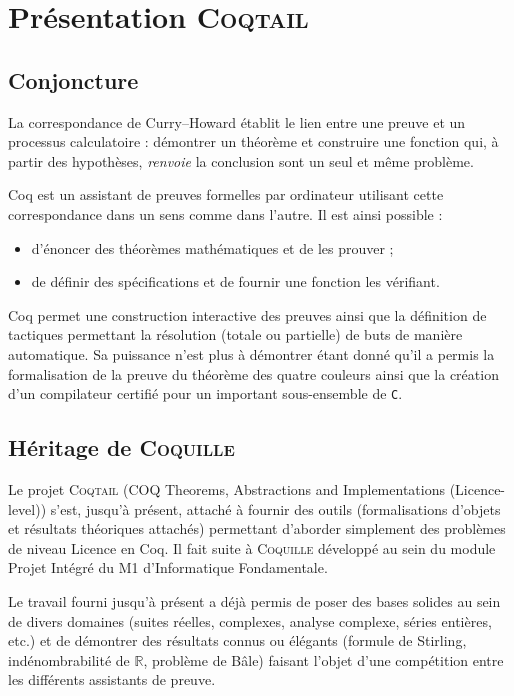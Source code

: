 \documentclass[11pt]{article}
\newcommand{\coqtail}{\textsc{Coqtail}}
\newcommand{\coquille}{\textsc{Coquille}}
\begin{document}
\section{Présentation \coqtail{}}

\subsection{Conjoncture}

La correspondance de Curry--Howard établit le lien entre une preuve et un processus calculatoire : démontrer un théorème et construire une fonction qui, à partir des hypothèses, \emph{renvoie} la conclusion sont un seul et même problème.

Coq\cite{L:BC04} est un assistant de preuves formelles par ordinateur utilisant cette correspondance dans un sens comme dans l'autre. Il est ainsi possible :
\begin{itemize}
  \item d'énoncer des théorèmes mathématiques et de les prouver ;
  \item de définir des spécifications et de fournir une fonction les vérifiant.
\end{itemize}

Coq permet une construction interactive des preuves ainsi que la définition de tactiques permettant la résolution (totale ou partielle) de buts de manière automatique. Sa puissance n'est plus à démontrer étant donné qu'il a permis la formalisation de la preuve du théorème des quatre couleurs\cite{Gonthier07} ainsi que la création d'un compilateur certifié pour un important sous-ensemble de \texttt{C}\cite{compcert}.

\subsection{Héritage de \coquille{}}

Le projet \coqtail{} (COQ Theorems, Abstractions and Implementations (Licence-level)) s'est, jusqu'à présent, attaché à fournir des outils (formalisations d'objets et résultats théoriques attachés) permettant d'aborder simplement des problèmes de niveau Licence en Coq. Il fait suite à \coquille{} développé au sein du module Projet Intégré du M1 d'Informatique Fondamentale.

Le travail fourni jusqu'à présent a déjà permis de poser des bases solides au sein de divers domaines (suites réelles, complexes, analyse complexe, séries entières, etc.) et de démontrer des résultats connus ou élégants (formule de Stirling, indénombrabilité de $\mathbb{R}$, problème de Bâle) faisant l'objet d'une compétition entre les différents assistants de preuve\cite{Freek}.
\end{document}
